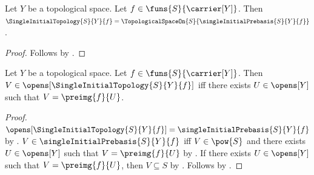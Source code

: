 \begin{theorem}\label{single_initial_topology_direct}
    Let $Y$ be a topological space.
    Let $f\in\funs{S}{\carrier[Y]}$.
    Then $\SingleInitialTopology{S}{Y}{f}
        =\TopologicalSpaceOn{S}{\singleInitialPrebasis{S}{Y}{f}}$.
\end{theorem}
\begin{proof}
    Follows by
        .
\end{proof}

\begin{proposition}\label{single_initial_topology_opens_iff}
    Let $Y$ be a topological space.
    Let $f\in\funs{S}{\carrier[Y]}$.
    Then $V\in\opens[\SingleInitialTopology{S}{Y}{f}]$ iff
        there exists $U\in\opens[Y]$ such that $V=\preimg{f}{U}$.
\end{proposition}
\begin{proof}
    $\opens[\SingleInitialTopology{S}{Y}{f}]
        =\singleInitialPrebasis{S}{Y}{f}$ by
        .
    $V\in\singleInitialPrebasis{S}{Y}{f}$ iff
        $V\in\pow{S}$ and there exists $U\in\opens[Y]$ such that
            $V=\preimg{f}{U}$ by .
    If there exists $U\in\opens[Y]$ such that $V=\preimg{f}{U}$, then
        $V\subseteq S$ by .
    Follows by .
\end{proof}

